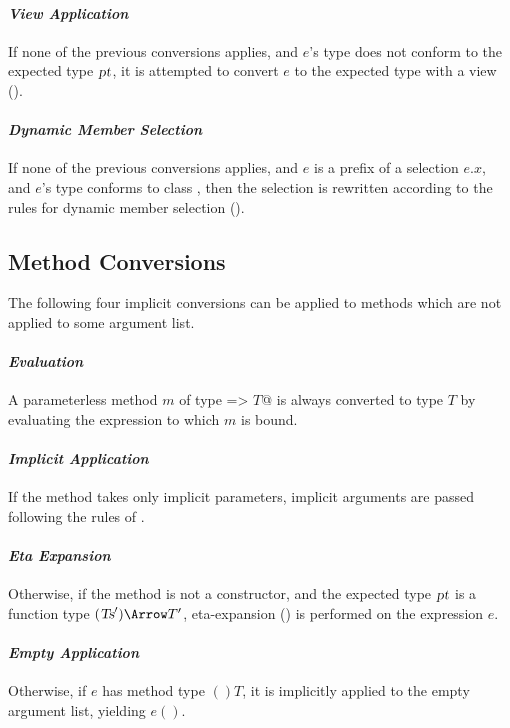 \paragraph{\em View Application}
If none of the previous conversions applies, and $e$'s type
does not conform to the expected type $\mbox{\sl pt}$, it is attempted to convert
$e$ to the expected type with a view ().\bigskip

\paragraph{\em Dynamic Member Selection}
If none of the previous conversions applies, and $e$ is a prefix
of a selection $e.x$, and $e$'s type conforms to class ,
then the selection is rewritten according to the rules for dynamic
member selection ().

\subsection{Method Conversions}

The following four implicit conversions can be applied to methods
which are not applied to some argument list.

\paragraph{\em Evaluation}
A parameterless method $m$ of type \lstinline@=> $T$@ is always converted to
type $T$ by evaluating the expression to which $m$ is bound.

\paragraph{\em Implicit Application}
  If the method takes only implicit parameters, implicit
  arguments are passed following the rules of .

\paragraph{\em Eta Expansion}
  Otherwise, if the method is not a constructor, 
  and the expected type $\mbox{\sl pt}$ is a function type
  $(\Ts') \Arrow T'$, eta-expansion
  () is performed on the
  expression $e$.

\paragraph{\em Empty Application}
  Otherwise, if $e$ has method type $()T$, it is implicitly applied to the empty
  argument list, yielding $e()$.

